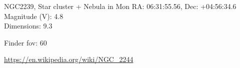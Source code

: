\begin{block}{NGC2239, Star cluster + Nebula in Mon}
    RA: 06:31:55.56, Dec: +04:56:34.6 \\ 
    Magnitude (V): 4.8 \\ 
    Dimensions: 9.3 

    Finder fov: 60 

    \url{https://en.wikipedia.org/wiki/NGC_2244} 
\end{block}